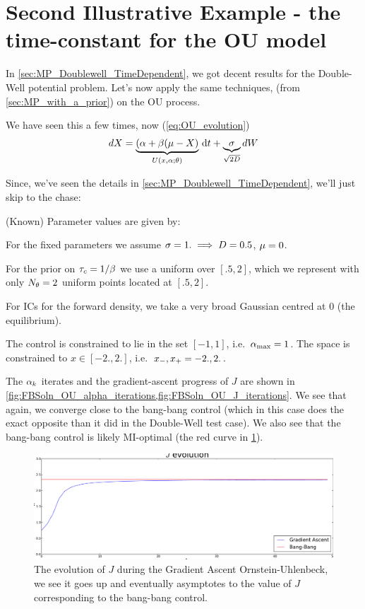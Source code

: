 \documentclass{article}
\begin{document}
\clearpage

\section{Second Illustrative Example - the time-constant for the OU model}
\label{sec:MP_OU_TimeDependent}

In \cref{sec:MP_Doublewell_TimeDependent}, we got decent results for the
Double-Well potential problem. Let's now apply the same techniques, (from
\cref{sec:MP_with_a_prior}) on the OU process.

We have seen this a few times, now (\cref{eq:OU_evolution})
$$
dX = \underbrace{({\alpha} + {\beta}( \mu - X)}_{U(x,{\alpha}; {\theta})} \, \mathrm{d} t +
\underbrace{{\sigma }}_{\sqrt{2D}} dW
$$

Since, we've seen the details in \cref{sec:MP_Doublewell_TimeDependent}, we'll
just skip to the chase:

(Known) Parameter values are given by: 

For the fixed parameters we assume ${\sigma } = 1. \implies D = 0.5$, ${\mu } = 0$.

For the prior on ${ \tau_{c} } = 1/{\beta}$ we use a uniform over $[.5,2]$, which we represent
with only $N_{\theta} = 2$ uniform points located at $[.5,2]$.  

For ICs for the forward density, we take a very broad Gaussian centred at $0$
(the equilibrium).

The control is constrained to lie in the set $[-1 , 1 ]$, i.e.\ ${ {\alpha}_{\textrm{max}} }
= 1$. The space is constrained to $x \in [-2.,2.]$, i.e.\ ${ x_{-} }, { x_{+} } =
-2.,2.$. 

The ${\alpha}_k$ iterates and the gradient-ascent progress of $J$ are shown
in \cref{fig:FBSoln_OU_alpha_iterations,fig:FBSoln_OU_J_iterations}. We see that
again, we converge close to the bang-bang control (which in this case does the
exact opposite than it did in the Double-Well test case). We also see that
the bang-bang control is likely MI-optimal (the red curve in
\cref{fig:FBSoln_OU_J_iterations}). 
 
 
\begin{figure}[htp]
\begin{center} 
  \includegraphics[width=.9\textwidth]{Figs/OUFBSolver/FB_J_iterates_uICs.pdf}
  \caption[labelInTOC]{The evolution of $J$ during the Gradient Ascent
  Ornstein-Uhlenbeck, we see it goes up and eventually asymptotes to the value
  of $J$ corresponding to the bang-bang control.}
  \label{fig:FBSoln_OU_J_iterations}
\end{center}
\end{figure}
\end{document}

